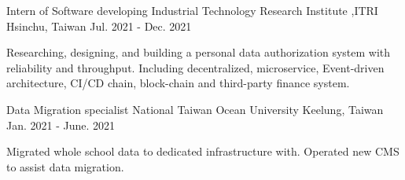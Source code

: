 

\begin{cventries}


  \cventry
    {Intern of Software developing} %
    {Industrial Technology Research Institute ,ITRI} %
    {Hsinchu, Taiwan} %
    {Jul. 2021 - Dec. 2021} %
    {
      \begin{cvitems} %
        \item {Researching, designing, and building a personal data authorization system with reliability and throughput. Including decentralized, microservice, Event-driven architecture, CI/CD chain, block-chain and third-party finance system. }
      \end{cvitems}
    }


  \cventry
    {Data Migration specialist} %
    {National Taiwan Ocean University} %
    {Keelung, Taiwan} %
    {Jan. 2021 - June. 2021} %
    {
      \begin{cvitems} %
        \item {Migrated whole school data to dedicated infrastructure with. Operated new CMS to assist data migration.}
      \end{cvitems}
    }

\end{cventries}
